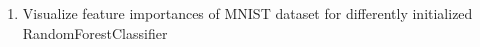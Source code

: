 \documentclass[USenglish,final,authoryear,12pt]{article}
\begin{document}
\begin{enumerate}
	\item Visualize feature importances of MNIST dataset for differently initialized RandomForestClassifier
\end{enumerate}
\end{document}
